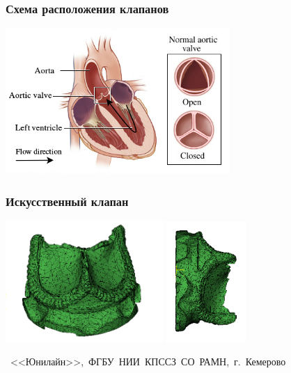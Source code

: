 \documentclass[14pt]{beamer}
\begin{document}
\begin{frame}
\frametitle{Схема расположения клапанов}
    \begin{center}
        \includegraphics[width=8.5cm]{aorta_scheme.png}
    \end{center}
\end{frame}

\begin{frame}
\frametitle{Искусственный клапан}
    \begin{center}
        \vspace{1.0cm}
        \includegraphics[width=6cm]{real_valve_3_1.png}
        \includegraphics[width=3cm]{real_valve2_1.png}

        \vspace{1.1cm}
        \mbox{\scriptsize
            <<Юнилайн>>, ФГБУ НИИ КПССЗ СО РАМН, г. Кемерово
        }
    \end{center}
\end{frame}
\end{document}
